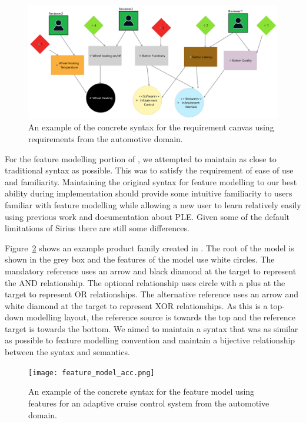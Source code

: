 \begin{figure}[hbt!]
	\centering
	\includegraphics[scale=0.043]{Figures/Requirement Diagram_SteeringWheel.jpg}
	\caption{An example of the concrete syntax for the requirement canvas using requirements from the automotive domain.}
	\label{fig:concrete_syntax_req_diag}
\end{figure}

For the feature modelling portion of \tool, we attempted to maintain as close to traditional syntax as possible. This was to satisfy the requirement of ease of use and familiarity. Maintaining the original syntax for feature modelling to our best ability during implementation should provide some intuitive familiarity to users familiar with feature modelling while allowing a new user to learn relatively easily using previous work and documentation about \ac{PLE}. Given some of the default limitations of Sirius there are still some differences. 

Figure~\ref{fig:concrete_syntax_feat_mod} shows an example product family created in \tool. The root of the model is shown in the grey box and the features of the model use white circles. The mandatory reference uses an arrow and black diamond at the target to represent the AND relationship. The optional relationship uses circle with a plus at the target to represent OR relationships. The alternative reference uses an arrow and white diamond at the target to represent XOR relationships. As this is a top-down modelling layout, the reference source is towards the top and the reference target is towards the bottom. We aimed to maintain a syntax that was as similar as possible to feature modelling convention and maintain a bijective relationship between the syntax and semantics.

\begin{figure}[hbt!]
	\centering
	\texttt{[image: feature\_model\_acc.png]}
	\caption{An example of the concrete syntax for the feature model using features for an adaptive cruise control system from the automotive domain.}
	\label{fig:concrete_syntax_feat_mod}
\end{figure}

